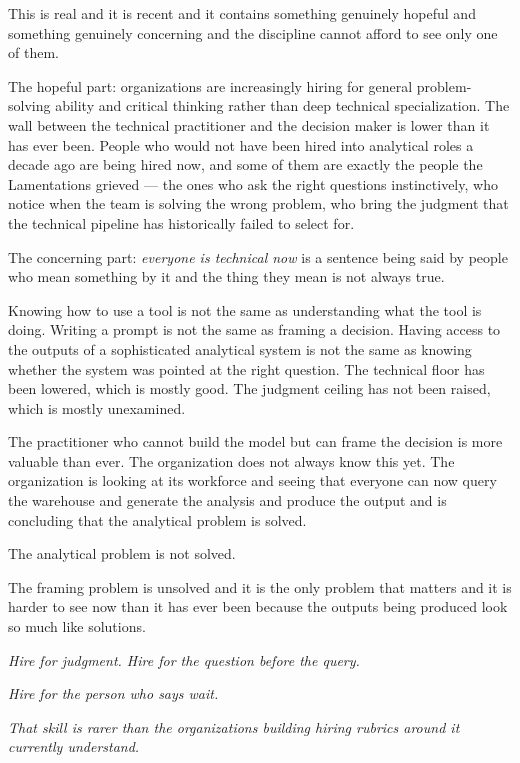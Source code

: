 This is real and it is recent and it contains something genuinely hopeful and something genuinely concerning and the discipline cannot afford to see only one of them.

The hopeful part: organizations are increasingly hiring for general problem-solving ability and critical thinking rather than deep technical specialization. The wall between the technical practitioner and the decision maker is lower than it has ever been. People who would not have been hired into analytical roles a decade ago are being hired now, and some of them are exactly the people the Lamentations grieved --- the ones who ask the right questions instinctively, who notice when the team is solving the wrong problem, who bring the judgment that the technical pipeline has historically failed to select for.

The concerning part: \textit{everyone is technical now} is a sentence being said by people who mean something by it and the thing they mean is not always true.

Knowing how to use a tool is not the same as understanding what the tool is doing. Writing a prompt is not the same as framing a decision. Having access to the outputs of a sophisticated analytical system is not the same as knowing whether the system was pointed at the right question. The technical floor has been lowered, which is mostly good. The judgment ceiling has not been raised, which is mostly unexamined.

The practitioner who cannot build the model but can frame the decision is more valuable than ever. The organization does not always know this yet. The organization is looking at its workforce and seeing that everyone can now query the warehouse and generate the analysis and produce the output and is concluding that the analytical problem is solved.

The analytical problem is not solved.

The framing problem is unsolved and it is the only problem that matters and it is harder to see now than it has ever been because the outputs being produced look so much like solutions.

\textit{Hire for judgment. Hire for the question before the query.}

\textit{Hire for the person who says wait.}

\textit{That skill is rarer than the organizations building hiring rubrics around it currently understand.}

